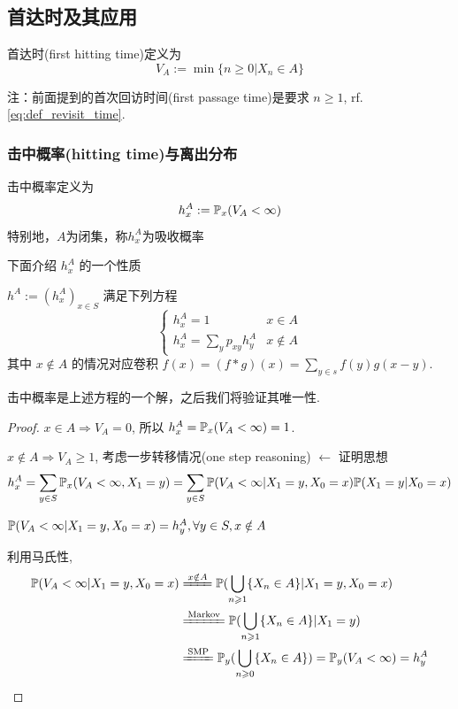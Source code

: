 \subsection{首达时及其应用}

\begin{definition}[首达时]
    首达时(first hitting time)定义为
    \begin{equation}
        V_A:=\min\{n\geq 0|X_n\in A\}
        \label{eq:FHT}
    \end{equation}
\end{definition}

注：前面提到的首次回访时间(first passage time)是要求 $n\geq 1$, rf. \eqref{eq:def_revisit_time}.

\subsubsection{击中概率(hitting time)与离出分布}

\begin{definition}[击中概率]
    击中概率定义为
    \begin{equation}
        h_x^A:=\mathbb{P}_x(V_A<\infty)
        \label{eq:HT}
    \end{equation}
    特别地，$A$为闭集，称$h_x^A$为吸收概率
\end{definition}

下面介绍 $h_x^A$ 的一个性质

\begin{lemma}
    $h^A:=(h_x^A)_{x\in S}$ 满足下列方程
    \begin{equation}
\begin{cases}
        h_x^A=1 & x\in A\\
        h_x^A=\sum_y p_{xy}h_y^A & x\notin A
    \end{cases}
\end{equation}
    其中 $x\notin A$ 的情况对应卷积 $f(x)=(f*g)(x)=\sum_{y\in s}f(y)g(x-y)$.
\end{lemma}

击中概率是上述方程的一个解，之后我们将验证其唯一性.
\begin{proof}
$x\in A\Rightarrow V_A=0$, 所以 $h_x^A = \mathbb{P}_x(V_A < \infty) = 1$.

$x\notin A\Rightarrow V_A\geq 1$, 考虑一步转移情况(one step reasoning) $\leftarrow$ 证明思想
\[
h_x^A=\sum_{y\in S}\mathbb{P}_x(V_A<\infty, X_1=y)=\sum_{y\in S}\mathbb{P}(V_A<\infty| X_1=y,X_0=x)\mathbb{P}(X_1=y|X_0=x)
\]
\begin{claim}
$\mathbb{P}(V_A<\infty|X_1=y,X_0=x)=h_y^A,\forall y\in S, x\notin A$
\end{claim}
利用马氏性,
\[
\begin{aligned}
    \PP(V_A<\infty| X_1=y,X_0=x) &\xlongequal{x\notin A}\PP(\bigcup_{n\geq 1}\{X_n\in A\}|X_1=y,X_0=x)\\
    &\xlongequal{\text{Markov}}\PP(\bigcup_{n\geq 1}\{X_n\in A\}|X_1=y)\\
    &\xlongequal{\text{SMP}}\PP_y(\bigcup_{n\geq 0}\{X_n\in A\})=\PP_y(V_A<\infty)=h_y^A
\end{aligned}
\]
\end{proof}

